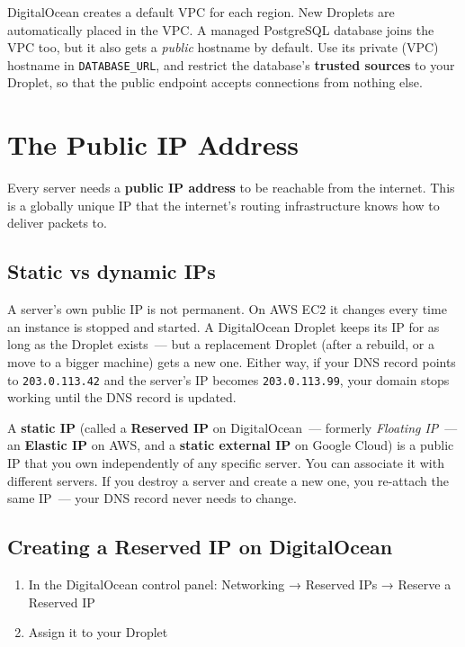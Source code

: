 \noindent{}DigitalOcean creates a default VPC for each region. New Droplets are automatically placed in the VPC. A managed PostgreSQL database joins the VPC too, but it also gets a \emph{public} hostname by default. Use its private (VPC) hostname in \texttt{DATABASE\_URL}, and restrict the database's \textbf{trusted sources} to your Droplet, so that the public endpoint accepts connections from nothing else.

\setcounter{section}{2}
\section{The Public IP Address}\label{22-network-configuration:223-the-public-ip-address}

Every server needs a \textbf{public IP address} to be reachable from the internet. This is a globally unique IP that the internet's routing infrastructure knows how to deliver packets to.

\subsection*{Static vs dynamic IPs}\label{22-network-configuration:static-vs-dynamic-ips}

A server's own public IP is not permanent. On AWS EC2 it changes every time an instance is stopped and started. A DigitalOcean Droplet keeps its IP for as long as the Droplet exists~--- but a replacement Droplet (after a rebuild, or a move to a bigger machine) gets a new one. Either way, if your DNS record points to \texttt{203.0.113.42} and the server's IP becomes \texttt{203.0.113.99}, your domain stops working until the DNS record is updated.

A \textbf{static IP} (called a \textbf{Reserved IP} on DigitalOcean~--- formerly \emph{Floating IP}~--- an \textbf{Elastic IP} on AWS, and a \textbf{static external IP} on Google Cloud) is a public IP that you own independently of any specific server. You can associate it with different servers. If you destroy a server and create a new one, you re-attach the same IP~--- your DNS record never needs to change.

\subsection*{Creating a Reserved IP on DigitalOcean}\label{22-network-configuration:creating-a-reserved-ip-on-digitalocean}

\begin{enumerate}
\def\labelenumi{\arabic{enumi}.}
\tightlist
\item
  In the DigitalOcean control panel: Networking → Reserved IPs → Reserve a Reserved IP
\item
  Assign it to your Droplet
\end{enumerate}

